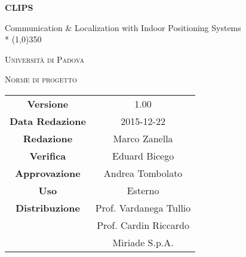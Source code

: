 \documentclass[a4paper,12pt]{article}
\author{Marco Zanella}
\date{22/12/2015}
\begin{document}
\begin{titlepage}
	\centering
	{\huge\bfseries CLIPS\par}
	Communication \& Localization with Indoor Positioning Systems \\*
	\line(1,0){350} \\
	{\scshape\LARGE Università di Padova \par}
	\vspace{1cm}
	{\scshape\Large Norme di progetto \par}
	\logo
	\newpage
		\begin{tabular}{c|c}
		{\hfill\textbf{Versione}} 			& 1.00				\\ 
		{\hfill\textbf{Data Redazione}} 	& 2015-12-22	  		 \\
		{\hfill\textbf{Redazione}} 			& Marco Zanella		\\ 
		{\hfill\textbf{Verifica}} 			& Eduard Bicego		\\ 
		{\hfill\textbf{Approvazione}} 		& Andrea Tombolato	\\ 
		{\hfill\textbf{Uso}} 				& Esterno	\\ 
		{\hfill\textbf{Distribuzione}} 		& Prof. Vardanega Tullio \\
											& Prof. Cardin Riccardo \\
											& Miriade S.p.A. \\ 
	\end{tabular}
\end{titlepage}
	
	\newpage

	\pagestyle{myfront}
	\newpage

	
	\label{LastFrontPage}
	

	\newpage
	
	\pagestyle{mymain}
	
	
		

	
		
	
	
		
	
	
		
				
	\label{LastPage}
\end{document}
